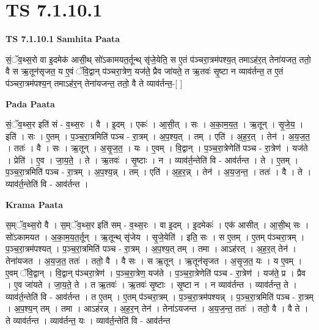 \documentclass[17pt]{extarticle}
\begin{document}
\section{ TS 7.1.10.1 }

\textbf{TS 7.1.10.1 } \newline
\textbf{Samhita Paata} \newline

सं॒ॅव॒थ्स॒रो वा इ॒दमेक॑ आसी॒थ् सो॑ऽकामयत॒र्तून्थ् सृ॑जे॒येति॒ स ए॒तं प॑ञ्चरा॒त्रम॑पश्य॒त् तमाऽह॑र॒त् तेना॑यजत॒ ततो॒ वै स ऋ॒तून॑सृजत॒ य ए॒वं ॅवि॒द्वान् प॑ञ्चरा॒त्रेण॒ यज॑ते॒ प्रैव जा॑यते॒ त ऋ॒तवः॑ सृ॒ष्टा न व्याव॑र्तन्त॒ त ए॒तं प॑ञ्चरा॒त्रम॑पश्य॒न् तमाऽह॑र॒न् तेना॑यजन्त॒ ततो॒ वै ते व्याव॑र्तन्त॒-[  ] \newline

\textbf{Pada Paata} \newline

सं॒ॅव॒थ्स॒र इति॑ सं - व॒थ्स॒रः । वै । इ॒दम् । एकः॑ । आ॒सी॒त् । सः । अ॒का॒म॒य॒त॒ । ऋ॒तून् । सृ॒जे॒य॒ । इति॑ । सः । ए॒तम् । प॒ञ्च॒रा॒त्रमिति॑ पञ्च - रा॒त्रम् । अ॒प॒श्य॒त् । तम् । एति॑ । अ॒ह॒र॒त् । तेन॑ । अ॒य॒ज॒त॒ । ततः॑ । वै । सः । ऋ॒तून् । अ॒सृ॒ज॒त॒ । यः । ए॒वम् । वि॒द्वान् । प॒ञ्च॒रा॒त्रेणेति॑ पञ्च - रा॒त्रेण॑ । यज॑ते । प्रेति॑ । ए॒व । जा॒य॒ते॒ । ते । ऋ॒तवः॑ । सृ॒ष्टाः । न । व्याव॑र्त॒न्तेति॑ वि - आव॑र्तन्त । ते । ए॒तम् । प॒ञ्च॒रा॒त्रमिति॑ पञ्च - रा॒त्रम् । अ॒प॒श्य॒न्न् । तम् । एति॑ । अ॒ह॒र॒न्न् । तेन॑ । अ॒य॒ज॒न्त॒ । ततः॑ । वै । ते । व्याव॑र्त॒न्तेति॑ वि - आव॑र्तन्त ।  \newline


\textbf{Krama Paata} \newline

स॒म्ॅव॒थ्स॒रो वै । स॒म्ॅव॒थ्स॒र इति॑ सम् - व॒थ्स॒रः । वा इ॒दम् । इ॒दमेकः॑ । एक॑ आसीत् । आ॒सी॒थ् सः । सो॑ऽकामयत । अ॒का॒म॒य॒त॒र्तून् । ऋ॒तून्थ् सृ॑जेय । सृ॒जे॒येति॑ । इति॒ सः । स ए॒तम् । ए॒तम् प॑ञ्चरा॒त्रम् । प॒ञ्च॒रा॒त्रम॑पश्यत् । प॒ञ्च॒रा॒त्रमिति॑ पञ्च - रा॒त्रम् । अ॒प॒श्य॒त् तम् । तमा । आऽह॑रत् । अ॒ह॒र॒त् तेन॑ । तेना॑यजत । अ॒य॒ज॒त॒ ततः॑ । ततो॒ वै । वै सः । स ऋ॒तून् । ऋ॒तून॑सृजत । अ॒सृ॒ज॒त॒ यः । य ए॒वम् । ए॒वम् ॅवि॒द्वान् । वि॒द्वान् प॑ञ्चरा॒त्रेण॑ । प॒ञ्च॒रा॒त्रेण॒ यज॑ते । प॒ञ्च॒रा॒त्रेणेति॑ पञ्च - रा॒त्रेण॑ । यज॑ते॒ प्र । प्रैव । ए॒व जा॑यते । जा॒य॒ते॒ ते । त ऋ॒तवः॑ । ऋ॒तवः॑ सृ॒ष्टाः । सृ॒ष्टा न । न व्याव॑र्तन्त । व्याव॑र्तन्त॒ ते । व्याव॑र्त॒न्तेति॑ वि - आव॑र्तन्त । त ए॒तम् । ए॒तम् प॑ञ्चरा॒त्रम् । प॒ञ्च॒रा॒त्रम॑पश्यन्न् । प॒ञ्च॒रा॒त्रमिति॑ पञ्च - रा॒त्रम् । अ॒प॒श्य॒न् तम् । तमा । आऽह॑रन्न् । अ॒ह॒र॒न् तेन॑ । तेना॑ऽयजन्त । अ॒य॒ज॒न्त॒ ततः॑ । ततो॒ वै । वै ते । ते व्याव॑र्तन्त । व्याव॑र्तन्त॒ यः । व्याव॑र्त॒न्तेति॑ वि - आव॑र्तन्त \newline
\end{document}
